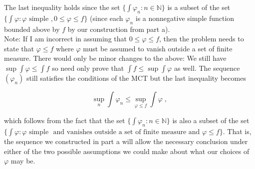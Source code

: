 \documentclass[a4paper]{article}
\begin{document}
The last inequality holds since the set $\{\int \varphi_n : n \in \mathbb{N}\}$ is a subset of the set $\{ \int \varphi : \varphi \text{ simple }, 0\leq \varphi \leq f \}$ (since each $\varphi_n$ is a nonnegative simple function bounded above by $f$ by our construction from part a). \\

Note: If I am incorrect in assuming that $0\leq \varphi \leq f$, then the problem needs to state that $\varphi \leq f$ where $\varphi$ must be assumed to vanish outside a set of finite measure. There would only be minor changes to the above: We still have $\sup \int \varphi \leq \int f$ so need only prove that $\int f \leq \sup \int \varphi$ as well. The sequence $(\varphi_n)$ still satisfies the conditions of the MCT but the last inequality becomes 

$$\sup_n \int \varphi_n \leq \sup_{\varphi \leq f} \int \varphi \;,$$

which follows from the fact that the set $\{\int \varphi_n : n \in \mathbb{N}\}$ is also a subset of the set $\{\int \varphi : \varphi \text{ simple } $ $\text{and vanishes outside a set of finite measure and } \varphi \leq f\}$. That is, the sequence we constructed in part a will allow the necessary conclusion under either of the two possible assumptions we could make about what our choices of $\varphi$ may be. 
\end{document}
